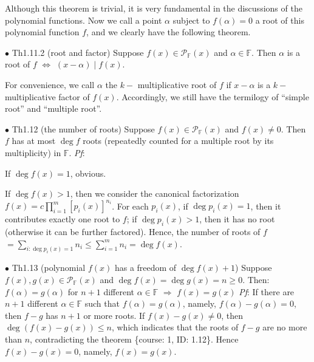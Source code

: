 \documentclass{article}
\begin{document}
\begin{Rmk}{}
    Although this theorem is trivial, it is very fundamental in the discussions of the polynomial functions. \textcolor{Df}{Now we call a point $\alpha$ subject to $f(\alpha)=0$ a root of this polynomial function $f$,} and we clearly have the following theorem.
\end{Rmk}

\begin{Th}{$\bullet$ Th1.11.2 (root and factor)}
    Suppose $f(x)\in\mathcal{P}_\mathbb{F}(x)$ and $\alpha\in\mathbb{F}$. Then $\alpha$ is a root of $f$ $\Leftrightarrow$ $(x-\alpha)\mid f(x)$.
\end{Th}

\begin{Rmk}{}
    For convenience, we call $\alpha$ the $k-$ multiplicative root of $f$ if $x-\alpha$ is a $k-$ multiplicative factor of $f(x)$. Accordingly, we still have the termilogy of ``simple root'' and ``multiple root''.
\end{Rmk}

\begin{Th}{$\bullet$ Th1.12 (the number of roots)}
    Suppose $f(x)\in\mathcal{P}_\mathbb{F}(x)$ and $f(x)\neq 0$. Then $f$ has at most $\deg f$ roots (repeatedly counted for a multiple root by its multiplicity) in $\mathbb{F}$.
    \tcblower
    \textit{Pf}: \begin{compactenum}
        \item If $\deg f(x) = 1 $, obvious.
        \item If $\deg f(x)>1$, then we consider the canonical factorization $f(x) = c\prod_{i=1}^{m}[p_i(x)]^{n_i}$. For each $p_i(x)$, if $\deg p_i(x) = 1$, then it contributes exactly one root to $f$; if $\deg p_i(x)>1$, then it has no root (otherwise it can be further factored). Hence, the number of roots of $f$ $=\sum_{i:\deg p_i(x) = 1} n_i \leq \sum_{i=1}^{m} n_i = \deg f(x)$.
    \end{compactenum} 
\end{Th}

\begin{Th}{$\bullet$ Th1.13 (polynomial $f(x)$ has a freedom of $\deg f(x)+1$)}
    Suppose $f(x), g(x)\in\mathcal{P}_\mathbb{F}(x)$ and $\deg f(x)=\deg g(x)= n\geq 0$. Then:\\
    $f(\alpha) = g(\alpha)$ for $n+1$ different $\alpha\in\mathbb{F}$ $\Rightarrow$ $f(x) = g(x)$
    \tcblower
    \textit{Pf}: If there are $n+1$ different $\alpha\in\mathbb{F}$ such that $f(\alpha) = g(\alpha)$, namely, $f(\alpha)-g(\alpha) = 0$, then $f-g$ has $n+1$ or more roots. If $f(x)-g(x)\neq 0$, then $\deg(f(x)-g(x))\leq n$, which indicates that the roots of $f-g$ are no more than $n$, contradicting the theorem \{course: 1, ID: 1.12\}. Hence $f(x)-g(x) = 0$, namely, $f(x) = g(x)$.
\end{Th}
\end{document}
